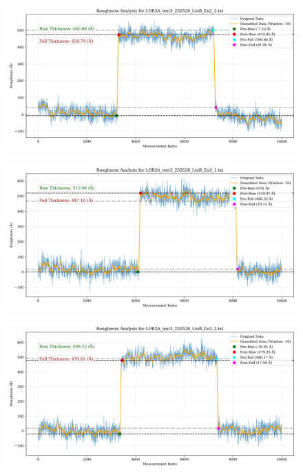 \documentclass[platex,dvipdfmx,10pt,twoside,a4paper,jis2004]{jsarticle}
\begin{document}
\begin{figure}[H]
    \centering
    \includegraphics[width=\textwidth]{LOR3A_test3_250526_LtoR_Ea2_2.png}
    \label{fig:LOR3Atest3250526LtoREa22}
\end{figure}
\begin{figure}[H]
    \centering
    \includegraphics[width=\textwidth]{LOR3A_test3_250526_LtoR_Ea3_1.png}
    \label{fig:LOR3Atest3250526LtoREa31}
\end{figure}
\begin{figure}[H]
    \centering
    \includegraphics[width=\textwidth]{LOR3A_test3_250526_LtoR_Ea3_2.png}
    \label{fig:LOR3Atest3250526LtoREa32}
\end{figure}
\end{document}
